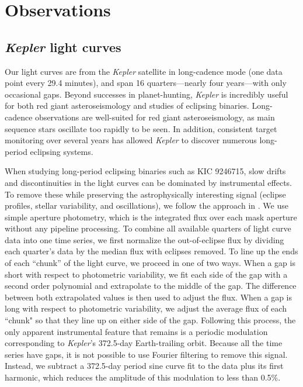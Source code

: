 \section{Observations}\label{data}

\subsection{\emph{Kepler} light curves}\label{kepler}
Our light curves are from the \emph{Kepler} satellite in long-cadence mode (one data point every 29.4 minutes), and span 16 quarters---nearly four years---with only occasional gaps. Beyond successes in planet-hunting, \emph{Kepler} is incredibly useful for both red giant asteroseismology and studies of eclipsing binaries. Long-cadence observations are well-suited for red giant asteroseismology, as main sequence stars oscillate too rapidly to be seen. In addition, consistent target monitoring over several years has allowed \emph{Kepler} to discover numerous long-period eclipsing systems.

When studying long-period eclipsing binaries such as KIC 9246715, slow drifts and discontinuities in the light curves can be dominated by instrumental effects. To remove these while preserving the astrophysically interesting signal (eclipse profiles, stellar variability, and oscillations), we follow the approach in \citet{gau14}. We use simple aperture photometry, which is the integrated flux over each mask aperture without any pipeline processing. To combine all available quarters of light curve data into one time series, we first normalize the out-of-eclipse flux by dividing each quarter's data by the median flux with eclipses removed. To line up the ends of each ``chunk'' of the light curve, we proceed in one of two ways. When a gap is short with respect to photometric variability, we fit each side of the gap with a second order polynomial and extrapolate to the middle of the gap. The difference between both extrapolated values is then used to adjust the flux. When a gap is long with respect to photometric variability, we adjust the average flux of each ``chunk" so that they line up on either side of the gap. Following this process, the only apparent instrumental feature that remains is a periodic modulation corresponding to \emph{Kepler}'s 372.5-day Earth-trailing orbit. Because all the time series have gaps, it is not possible to use Fourier filtering to remove this signal. Instead, we subtract a 372.5-day period sine curve fit to the data plus its first harmonic, which reduces the amplitude of this modulation to less than 0.5\%.

